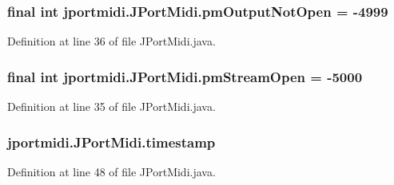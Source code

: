 \subsubsection[{\texorpdfstring{pm\+Output\+Not\+Open}{pmOutputNotOpen}}]{\setlength{\rightskip}{0pt plus 5cm}final {\bf int} jportmidi.\+J\+Port\+Midi.\+pm\+Output\+Not\+Open = -\/4999}\hypertarget{classjportmidi_1_1_j_port_midi_a7c80486147954f40134a2582f6eb2297}{}\label{classjportmidi_1_1_j_port_midi_a7c80486147954f40134a2582f6eb2297}


Definition at line 36 of file J\+Port\+Midi.\+java.

\subsubsection[{\texorpdfstring{pm\+Stream\+Open}{pmStreamOpen}}]{\setlength{\rightskip}{0pt plus 5cm}final {\bf int} jportmidi.\+J\+Port\+Midi.\+pm\+Stream\+Open = -\/5000}\hypertarget{classjportmidi_1_1_j_port_midi_a5832f134146052039518c4dc799ac3b1}{}\label{classjportmidi_1_1_j_port_midi_a5832f134146052039518c4dc799ac3b1}


Definition at line 35 of file J\+Port\+Midi.\+java.

\subsubsection[{\texorpdfstring{timestamp}{timestamp}}]{ jportmidi.\+J\+Port\+Midi.\+timestamp\hspace{0.3cm}{\ttfamily [protected]}}\hypertarget{classjportmidi_1_1_j_port_midi_af439d1f2427e3b7727e7419853ef66d2}{}\label{classjportmidi_1_1_j_port_midi_af439d1f2427e3b7727e7419853ef66d2}


Definition at line 48 of file J\+Port\+Midi.\+java.

